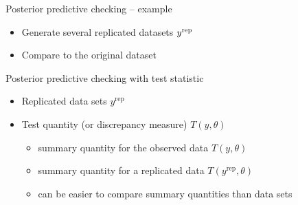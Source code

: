 \documentclass[t]{beamer}
\DeclareMathOperator{\rep}{\mathrm{rep}}
\begin{document}
\begin{frame}[fragile]

  {\Large\color{navyblue} Posterior predictive checking -- example}

  \begin{itemize}
  \item<1-> Generate several replicated datasets $y^{\rm rep}$
  \item<2-> Compare to the original dataset
  \end{itemize}
  \vspace{-1\baselineskip}

\end{frame}


\begin{frame}

  {\Large\color{navyblue} Posterior predictive checking with test statistic}

  \begin{itemize}
  \item Replicated data sets $y^{\rep}$
  \item Test quantity (or discrepancy measure) $T(y,\theta)$
    \begin{itemize}
    \item summary quantity for the observed data $T(y,\theta)$
    \item summary quantity for a replicated data $T(y^{\rep},\theta)$
    \item can be easier to compare summary quantities than data sets
    \end{itemize}
  \end{itemize}

\end{frame}
\end{document}
